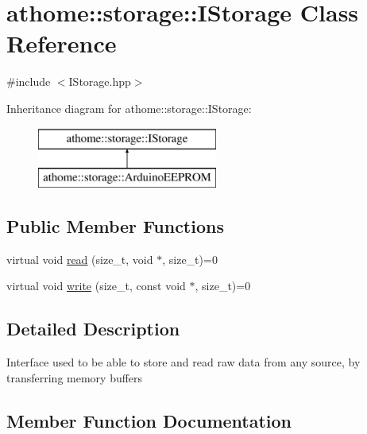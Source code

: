 \hypertarget{classathome_1_1storage_1_1_i_storage}{}\section{athome\+:\+:storage\+:\+:I\+Storage Class Reference}
\label{classathome_1_1storage_1_1_i_storage}


{\ttfamily \#include $<$I\+Storage.\+hpp$>$}

Inheritance diagram for athome\+:\+:storage\+:\+:I\+Storage\+:\begin{figure}[H]
\begin{center}
\leavevmode
\includegraphics[height=2.000000cm]{classathome_1_1storage_1_1_i_storage}
\end{center}
\end{figure}
\subsection*{Public Member Functions}
\begin{DoxyCompactItemize}
\item 
virtual void \mbox{\hyperlink{classathome_1_1storage_1_1_i_storage_af623393cdf559addf167463ce4e7005e}{read}} (size\+\_\+t, void $\ast$, size\+\_\+t)=0
\item 
virtual void \mbox{\hyperlink{classathome_1_1storage_1_1_i_storage_a1017bb6ad438313b98197893954e52f1}{write}} (size\+\_\+t, const void $\ast$, size\+\_\+t)=0
\end{DoxyCompactItemize}


\subsection{Detailed Description}
Interface used to be able to store and read raw data from any source, by transferring memory buffers 

\subsection{Member Function Documentation}
\mbox{\label{classathome_1_1storage_1_1_i_storage_af623393cdf559addf167463ce4e7005e}} 
